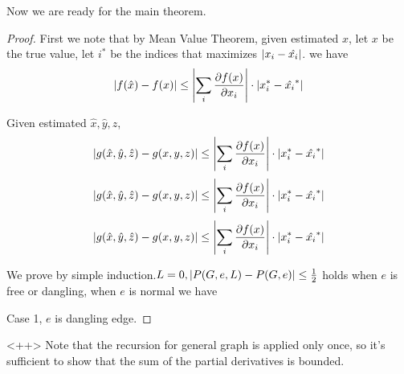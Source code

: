 	Now we are ready for the main theorem.

	\begin{proof}
		First we note that by Mean Value Theorem,
		given estimated $\hat{x}$, let $x$ be the true value, let $i^*$ be the indices that maximizes $\left\vert x_i - \hat{x_i}\right\vert$.
		we have
		\[ \left\vert f(\hat{x}) - f(x)\right\vert \leq \left\vert\sum_i \frac{\partial f(x)}{\partial x_i}\right\vert \cdot \left\vert x_i^* - \hat{x_i}^*\right\vert \]

		Given estimated $\hat{x},\hat{y},\hat{z}$,
		\[ \left\vert g(\hat{x}, \hat{y}, \hat{z}) - g(x,y,z)\right\vert \leq \left\vert\sum_i \frac{\partial f(x)}{\partial x_i}\right\vert \cdot \left\vert x_i^* - \hat{x_i}^*\right\vert \]
		\[ \left\vert g(\hat{x}, \hat{y}, \hat{z}) - g(x,y,z)\right\vert \leq \left\vert\sum_i \frac{\partial f(x)}{\partial x_i}\right\vert \cdot \left\vert x_i^* - \hat{x_i}^*\right\vert \]
		\[ \left\vert g(\hat{x}, \hat{y}, \hat{z}) - g(x,y,z)\right\vert \leq \left\vert\sum_i \frac{\partial f(x)}{\partial x_i}\right\vert \cdot \left\vert x_i^* - \hat{x_i}^*\right\vert \]


		We prove by simple induction.$L=0, \left\vert P(G,e,L) - P(G,e)\right\vert \leq \frac{1}{2}$ holds when $e$ is free or dangling, when $e$ is normal we have 

		Case 1, $e$ is dangling edge.
	\end{proof}<++>
	Note that the recursion for general graph is applied only once, so it's sufficient to show that the sum of the partial derivatives is bounded.
